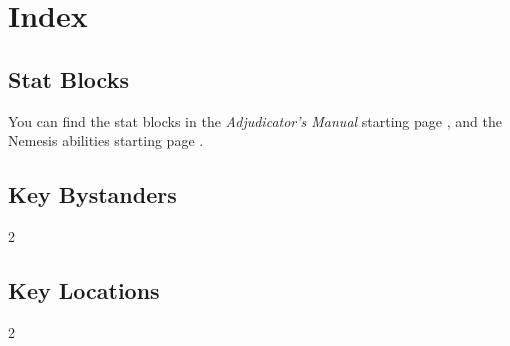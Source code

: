 \chapter{Index}
\label{ch:index}
\vspace{-20mm}
%
\section{Stat Blocks}
You can find the stat blocks in the \emph{Adjudicator's Manual} starting page \pageref*{gm-sec:creatures},
and the Nemesis abilities starting page \pageref*{gm-ch:nemesis}.
\section{Key Bystanders}
\vspace{4mm}
\begin{multicols}{2}
\end{multicols}
%
\section{Key Locations}
\vspace{4mm}
\begin{multicols}{2}
\end{multicols}
